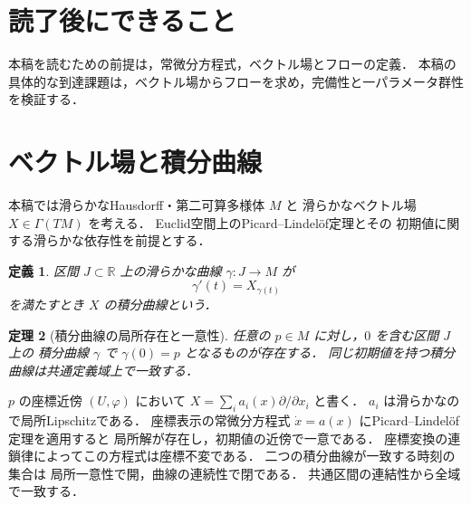 \documentclass[a5paper,10pt,onecolumn]{jsarticle}
\makeatletter
\theoremstyle{mathnotetheorem}
\newtheorem{theorem}{定理}[section]
\newtheorem{definition}[theorem]{定義}
\renewcommand{\proofname}{証明}
\renewenvironment{proof}[1][\proofname]{%
  \par\pushQED{\qed}\normalfont\topsep4\p@\@plus2\p@\relax
  \trivlist\item[\hskip\labelsep\bfseries #1]\ignorespaces
}{\popQED\endtrivlist\@endpefalse}
\makeatother
\begin{document}
\section*{読了後にできること}
本稿を読むための前提は，常微分方程式，ベクトル場とフローの定義．
本稿の具体的な到達課題は，ベクトル場からフローを求め，完備性と一パラメータ群性を検証する．


\section{ベクトル場と積分曲線}
本稿では滑らかなHausdorff・第二可算多様体 $M$ と
滑らかなベクトル場 $X\in\Gamma(TM)$ を考える．
Euclid空間上のPicard--Lindel\"of定理とその
初期値に関する滑らかな依存性を前提とする．
\begin{definition}
区間 $J\subset\mathbb R$ 上の滑らかな曲線
$\gamma:J\to M$ が
\[
 \gamma'(t)=X_{\gamma(t)}
\]
を満たすとき $X$ の積分曲線という．
\end{definition}
\begin{theorem}[積分曲線の局所存在と一意性]
任意の $p\in M$ に対し，$0$ を含む区間 $J$ 上の
積分曲線 $\gamma$ で $\gamma(0)=p$ となるものが存在する．
同じ初期値を持つ積分曲線は共通定義域上で一致する．
\end{theorem}
\begin{proof}
$p$ の座標近傍 $(U,\varphi)$ において
$X=\sum_i a_i(x)\partial/\partial x_i$ と書く．
$a_i$ は滑らかなので局所Lipschitzである．
座標表示の常微分方程式
$\dot x=a(x)$ にPicard--Lindel\"of定理を適用すると
局所解が存在し，初期値の近傍で一意である．
座標変換の連鎖律によってこの方程式は座標不変である．
二つの積分曲線が一致する時刻の集合は
局所一意性で開，曲線の連続性で閉である．
共通区間の連結性から全域で一致する．
\end{proof}
\end{document}
